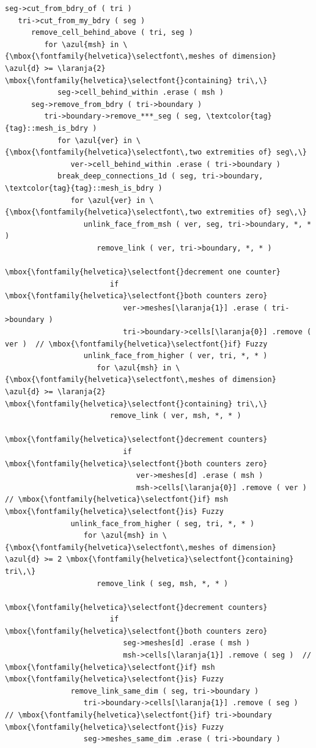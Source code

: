 \begin{Verbatim}[commandchars=\\\{\},formatcom=\small\tt,baselinestretch=0.94]
seg->cut_from_bdry_of ( tri )
   tri->cut_from_my_bdry ( seg )
      remove_cell_behind_above ( tri, seg )
         for \azul{msh} in \{\mbox{\fontfamily{helvetica}\selectfont\,meshes of dimension} \azul{d} >= \laranja{2} \mbox{\fontfamily{helvetica}\selectfont{}containing} tri\,\}
            seg->cell_behind_within .erase ( msh )
      seg->remove_from_bdry ( tri->boundary )
         tri->boundary->remove_***_seg ( seg, \textcolor{tag}{tag}::mesh_is_bdry )
            for \azul{ver} in \{\mbox{\fontfamily{helvetica}\selectfont\,two extremities of} seg\,\}
               ver->cell_behind_within .erase ( tri->boundary )
            break_deep_connections_1d ( seg, tri->boundary, \textcolor{tag}{tag}::mesh_is_bdry )
               for \azul{ver} in \{\mbox{\fontfamily{helvetica}\selectfont\,two extremities of} seg\,\}
                  unlink_face_from_msh ( ver, seg, tri->boundary, *, * )
                     remove_link ( ver, tri->boundary, *, * )
                        \mbox{\fontfamily{helvetica}\selectfont{}decrement one counter}
                        if \mbox{\fontfamily{helvetica}\selectfont{}both counters zero}
                           ver->meshes[\laranja{1}] .erase ( tri->boundary )
                           tri->boundary->cells[\laranja{0}] .remove ( ver )  // \mbox{\fontfamily{helvetica}\selectfont{}if} Fuzzy
                  unlink_face_from_higher ( ver, tri, *, * )
                     for \azul{msh} in \{\mbox{\fontfamily{helvetica}\selectfont\,meshes of dimension} \azul{d} >= \laranja{2} \mbox{\fontfamily{helvetica}\selectfont{}containing} tri\,\}
                        remove_link ( ver, msh, *, * )
                           \mbox{\fontfamily{helvetica}\selectfont{}decrement counters}
                           if \mbox{\fontfamily{helvetica}\selectfont{}both counters zero}
                              ver->meshes[d] .erase ( msh )
                              msh->cells[\laranja{0}] .remove ( ver )  // \mbox{\fontfamily{helvetica}\selectfont{}if} msh \mbox{\fontfamily{helvetica}\selectfont{}is} Fuzzy
               unlink_face_from_higher ( seg, tri, *, * )
                  for \azul{msh} in \{\mbox{\fontfamily{helvetica}\selectfont\,meshes of dimension} \azul{d} >= 2 \mbox{\fontfamily{helvetica}\selectfont{}containing} tri\,\}
                     remove_link ( seg, msh, *, * )
                        \mbox{\fontfamily{helvetica}\selectfont{}decrement counters}
                        if \mbox{\fontfamily{helvetica}\selectfont{}both counters zero}
                           seg->meshes[d] .erase ( msh )
                           msh->cells[\laranja{1}] .remove ( seg )  // \mbox{\fontfamily{helvetica}\selectfont{}if} msh \mbox{\fontfamily{helvetica}\selectfont{}is} Fuzzy
               remove_link_same_dim ( seg, tri->boundary )
                  tri->boundary->cells[\laranja{1}] .remove ( seg )  // \mbox{\fontfamily{helvetica}\selectfont{}if} tri->boundary \mbox{\fontfamily{helvetica}\selectfont{}is} Fuzzy
                  seg->meshes_same_dim .erase ( tri->boundary )
\end{Verbatim}


